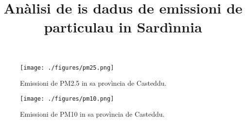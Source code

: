 \documentclass[a4paper]{article}
\begin{document}
\title{Anàlisi de is dadus de emissioni de particulau in Sardìnnia}
\maketitle

\begin{figure}
    \centering
    \texttt{[image: ./figures/pm25.png]}
    \caption{Emissioni de PM2.5 in sa provìncia de Casteddu.}
    \label{fig:pm25-prov-casteddu}
\end{figure}

\begin{figure}
    \centering
    \texttt{[image: ./figures/pm10.png]}
    \caption{Emissioni de PM10 in sa provìncia de Casteddu.}
    \label{fig:pm10-prov-casteddu}
\end{figure}
\end{document}
